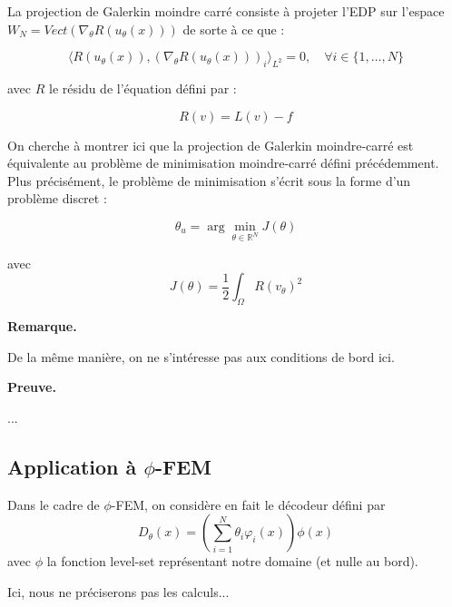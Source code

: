 \documentclass[french]{article}
\newenvironment{preuve}[1][]{\begin{tcolorbox}[
	colback=white, %
	colframe=green!70!black, %
	arc=2mm, %
	boxrule=1pt, %
	breakable, enhanced jigsaw
	]
	\textcolor{green!70!black}{\textbf{Preuve.} \\}

	#1
}{\end{tcolorbox}}
\newenvironment{remarque}[1][]{\begin{tcolorbox}[
	colback=white, %
	arc=2mm, %
	borderline={0.5mm}{0mm}{black!15!white},
	borderline={0.5mm}{0mm}{black!50!white,dashed},
	breakable, enhanced jigsaw
	]
	\textcolor{black!70!black}{\textbf{Remarque.}} #1
}{\end{tcolorbox}}
\begin{document}
\begin{itemize}[label=]
		La projection de Galerkin moindre carré consiste à projeter l'EDP sur l'espace $W_N=Vect(\nabla_\theta R(u_\theta(x)))$ de sorte à ce que :
		
		\begin{equation*}
			\langle R(u_\theta(x)), (\nabla_\theta R(u_\theta(x)))_i\rangle_{L^2} = 0, \quad \forall i \in \{1,\dots,N\}
		\end{equation*}
		
		avec $R$ le résidu de l'équation défini par :
		
		\begin{equation*}
			R(v) = L(v) - f
		\end{equation*}
		
		On cherche à montrer ici que la projection de Galerkin moindre-carré est équivalente au problème de minimisation moindre-carré défini précédemment. Plus précisément, le problème de minimisation s'écrit sous la forme d'un problème discret :
		
		\begin{equation}
			\theta_u = \arg\min_{\theta \in \mathbb{R}^N}J(\theta) \label{min_moindrecarre_discret}
		\end{equation}
		
		avec
		\begin{equation*}
			J(\theta)=\frac{1}{2}\int_\Omega R(v_\theta)^2
		\end{equation*}
		
		\begin{remarque}
			De la même manière, on ne s'intéresse pas aux conditions de bord ici.
		\end{remarque}
	
		\begin{preuve}			
...
		\end{preuve}	
	\end{itemize}

	\subsection{Application à $\phi$-FEM}
	
	Dans le cadre de $\phi$-FEM, on considère en fait le décodeur défini par
	\begin{equation*}
		D_\theta(x) = \left(\sum_{i=1}^N \theta_i \varphi_i(x)\right)\phi(x)
	\end{equation*}
	avec $\phi$ la fonction level-set représentant notre domaine (et nulle au bord).
	
	Ici, nous ne préciserons pas les calculs...
	
\end{document}
